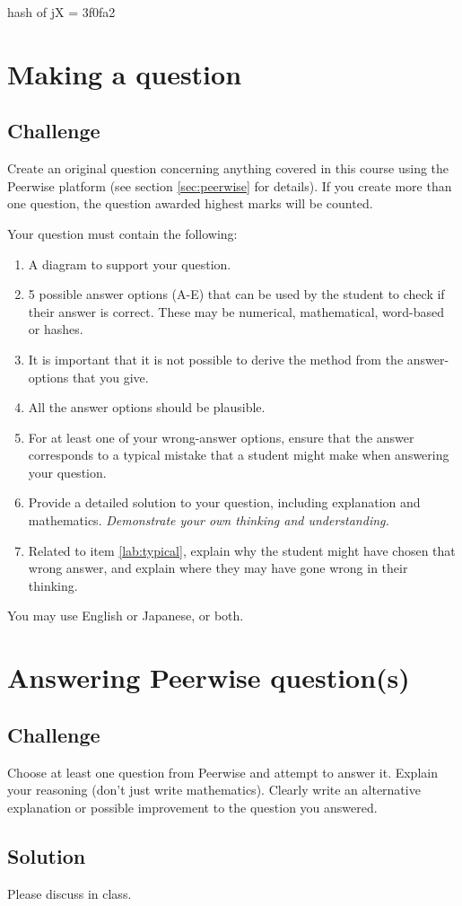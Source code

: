 hash of jX = 3f0fa2




\newpage
\section{Making a question}


\subsection*{Challenge}
Create an original question concerning anything covered in this course using the Peerwise platform (see section \ref{sec:peerwise} for details). If you create more than one question, the question awarded highest marks will be counted.

Your question must contain the following:
\begin{enumerate}
    \item A diagram to support your question.
    \item 5 possible answer options (A-E) that can be used by the student to check if their answer is correct. These may be numerical, mathematical, word-based or hashes.
    \item It is important that it is not possible to derive the method from the answer-options that you give.
    \item All the answer options should be plausible.
    \item For at least one of your wrong-answer options, ensure that the answer corresponds to a typical mistake that a student might make when answering your question. \label{lab:typical}
    \item Provide a detailed solution to your question, including explanation and mathematics. \emph{Demonstrate your own thinking and understanding.}
    \item Related to item \ref{lab:typical}, explain why the student might have chosen that wrong answer, and explain where they may have gone wrong in their thinking.
\end{enumerate}
You may use English or Japanese, or both.




\newpage
\section{Answering Peerwise question(s)}

\subsection*{Challenge}
Choose at least one question from Peerwise and attempt to answer it.
Explain your reasoning (don't just write mathematics).
Clearly write an alternative explanation or possible improvement to the question you answered.

\subsection*{Solution}
Please discuss in class.
